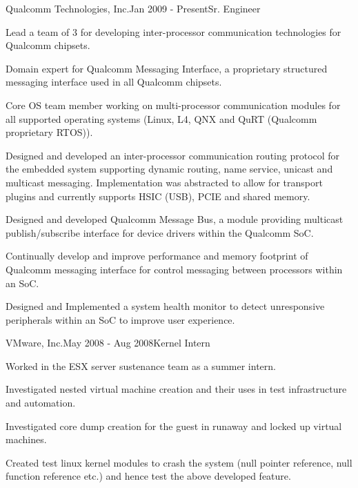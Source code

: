 \begin{rSubsection}{Qualcomm Technologies, Inc.}{Jan 2009 - Present}{Sr. Engineer}{}
  \item Lead a team of 3 for developing inter-processor communication technologies for Qualcomm chipsets.
  \item Domain expert for Qualcomm Messaging Interface, a proprietary structured messaging interface used in all Qualcomm chipsets.
  \item Core OS team member working on multi-processor communication modules for all supported operating systems (Linux, L4, QNX and QuRT (Qualcomm proprietary RTOS)).
  \item Designed and developed an inter-processor communication routing protocol for the embedded system supporting dynamic routing, name service, unicast and multicast messaging. Implementation was abstracted to allow for transport plugins and currently supports HSIC (USB), PCIE and shared memory.
  \item Designed and developed Qualcomm Message Bus, a module providing multicast publish/subscribe interface for device drivers within the Qualcomm SoC. 
  \item Continually develop and improve performance and memory footprint of Qualcomm messaging interface for control messaging between processors within an SoC.
  \item Designed and Implemented a system health monitor to detect unresponsive peripherals within an SoC to improve user experience.
\end{rSubsection}


\begin{rSubsection}{VMware, Inc.}{May 2008 - Aug 2008}{Kernel Intern}{}
  \item Worked in the ESX server sustenance team as a summer intern.
  \item Investigated nested virtual machine creation and their uses in test infrastructure and automation.
  \item Investigated core dump creation for the guest in runaway and locked up virtual machines.
  \item Created test linux kernel modules to crash the system (null pointer reference, null function reference etc.) and hence test the above developed feature.
\end{rSubsection}


